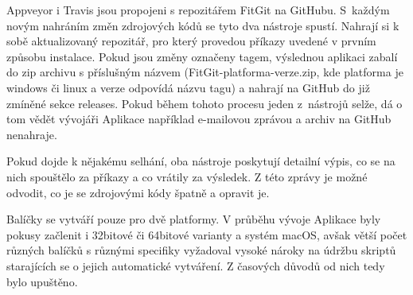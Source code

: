 Appveyor i Travis jsou propojeni s repozitářem FitGit na GitHubu. S~každým novým nahráním změn zdrojových kódů se tyto dva nástroje spustí. Nahrají si k sobě aktualizovaný repozitář, pro který provedou příkazy uvedené v prvním způsobu instalace. Pokud jsou změny označeny tagem, výslednou aplikaci zabalí do zip archivu s příslušným názvem (FitGit-platforma-verze.zip, kde platforma je windows či linux a verze odpovídá názvu tagu) a nahrají na GitHub do již zmíněné sekce releases. Pokud během tohoto procesu jeden z~nástrojů selže, dá o tom vědět vývojáři Aplikace například e-mailovou zprávou a archiv na GitHub nenahraje.

Pokud dojde k nějakému selhání, oba nástroje poskytují detailní výpis, co se na nich spouštělo za příkazy a co vrátily za výsledek. Z této zprávy je možné odvodit, co je se zdrojovými kódy špatně a opravit je.

Balíčky se vytváří pouze pro dvě platformy. V průběhu vývoje Aplikace byly pokusy začlenit i 32bitové či 64bitové varianty a systém macOS, avšak větší počet různých balíčků s různými specifiky vyžadoval vysoké nároky na údržbu skriptů starajících se o jejich automatické vytváření. Z časových důvodů od nich tedy bylo upuštěno.
